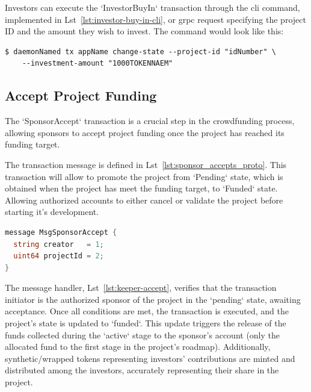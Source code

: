 Investors can execute the `InvestorBuyIn` transaction through the \gls{cli} command, implemented in Lst~\ref{lst:investor-buy-in-cli}, or \gls{grpc} request specifying the project ID and the amount they wish to invest. The command would look like this:

\begin{verbatim}
$ daemonNamed tx appName change-state --project-id "idNumber" \
    --investment-amount "1000TOKENNAEM"
\end{verbatim}

\subsection{Accept Project Funding}
\label{subsec:sponsor_accepts}

The `SponsorAccept` transaction is a crucial step in the crowdfunding process, allowing sponsors to accept project funding once the project has reached its funding target. 

The transaction message is defined in Lst~\ref{lst:sponsor_accepts_proto}. This transaction will allow to promote the project from `Pending` state, which is obtained when the project has meet the funding target, to `Funded` state. Allowing authorized accounts to either cancel or validate the project before starting it's development.

\begin{lstlisting}[language=go, caption=SponsorAccepts protobuf definition,label={lst:sponsor_accepts_proto}]
message MsgSponsorAccept {
  string creator   = 1;
  uint64 projectId = 2;
}
\end{lstlisting}

The message handler, Lst~\ref{lst:keeper-accept}, verifies that the transaction initiator is the authorized sponsor of the project in the `pending` state, awaiting acceptance. Once all conditions are met, the transaction is executed, and the project's state is updated to `funded`. This update triggers the release of the funds collected during the `active` stage to the sponsor's account (only the allocated fund to the first stage in the project's roadmap). Additionally, synthetic/wrapped tokens representing investors' contributions are minted and distributed among the investors, accurately representing their share in the project.

